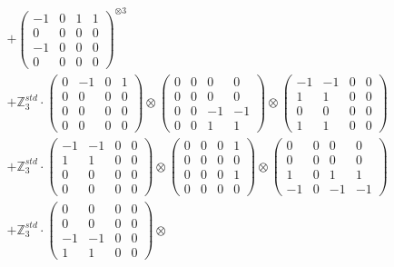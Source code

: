 \documentclass{article}
\begin{document}
{\begin{align}
        &+ \label{Rs16-Rc11-Solution-29-c16} \begin{pmatrix} -1 & 0 & 1 & 1 \\ 0 & 0 & 0 & 0 \\ -1 & 0 & 0 & 0 \\ 0 & 0 & 0 & 0 \end{pmatrix}^{\otimes 3} \\
        &+ \label{Rs16-Rc11-Solution-29-c17} \mathbb{Z}_3^{std} \cdot 
            \begin{pmatrix} 0 & -1 & 0 & 1 \\ 0 & 0 & 0 & 0 \\ 0 & 0 & 0 & 0 \\ 0 & 0 & 0 & 0 \end{pmatrix} \otimes 
            \begin{pmatrix} 0 & 0 & 0 & 0 \\ 0 & 0 & 0 & 0 \\ 0 & 0 & -1 & -1 \\ 0 & 0 & 1 & 1 \end{pmatrix} \otimes 
            \begin{pmatrix} -1 & -1 & 0 & 0 \\ 1 & 1 & 0 & 0 \\ 0 & 0 & 0 & 0 \\ 1 & 1 & 0 & 0 \end{pmatrix} \\ 
        &+ \label{Rs16-Rc11-Solution-29-c18} \mathbb{Z}_3^{std} \cdot 
            \begin{pmatrix} -1 & -1 & 0 & 0 \\ 1 & 1 & 0 & 0 \\ 0 & 0 & 0 & 0 \\ 0 & 0 & 0 & 0 \end{pmatrix} \otimes 
            \begin{pmatrix} 0 & 0 & 0 & 1 \\ 0 & 0 & 0 & 0 \\ 0 & 0 & 0 & 1 \\ 0 & 0 & 0 & 0 \end{pmatrix} \otimes 
            \begin{pmatrix} 0 & 0 & 0 & 0 \\ 0 & 0 & 0 & 0 \\ 1 & 0 & 1 & 1 \\ -1 & 0 & -1 & -1 \end{pmatrix} \\ 
        &+ \label{Rs16-Rc11-Solution-29-c19} \mathbb{Z}_3^{std} \cdot 
            \begin{pmatrix} 0 & 0 & 0 & 0 \\ 0 & 0 & 0 & 0 \\ -1 & -1 & 0 & 0 \\ 1 & 1 & 0 & 0 \end{pmatrix} \otimes 

\end{align}}
\end{document}
